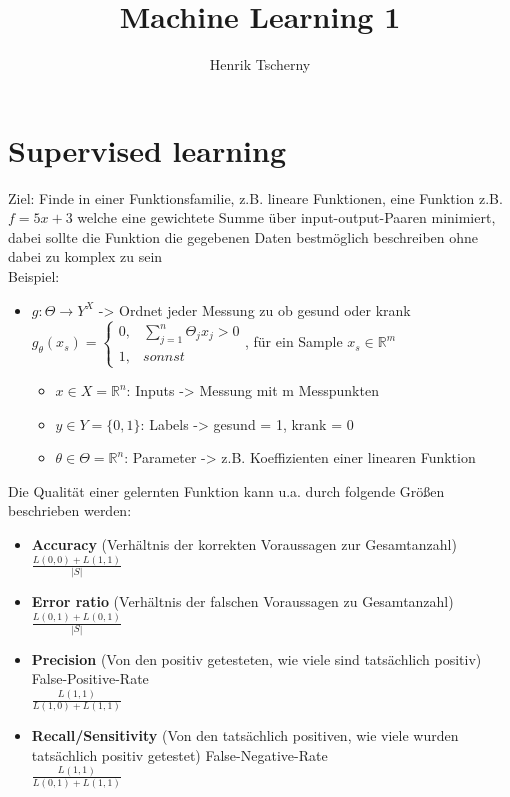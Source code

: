 \documentclass[12pt,a4paper]{article}
\title{Machine Learning 1}
\author{Henrik Tscherny}
\newcommand{\nl}{\\[0.1cm]}
\begin{document}
\maketitle
\tableofcontents

\section{Supervised learning}
Ziel: Finde in einer Funktionsfamilie, z.B. lineare Funktionen, eine Funktion z.B. $f = 5x+3$ welche eine gewichtete Summe über input-output-Paaren minimiert, dabei sollte die Funktion die gegebenen Daten bestmöglich beschreiben ohne dabei zu komplex zu sein\\

Beispiel:
\begin{itemize}
\item $g: \Theta \rightarrow Y^X$ -> Ordnet jeder Messung zu ob gesund oder krank\\
$g_{\theta}(x_s) = \begin{cases} 0, & \displaystyle\sum_{j=1}^n \Theta_j x_j > 0 \\ 1, & sonnst \end{cases}$, für ein Sample $x_s\in \mathbb{R}^m$
\begin{itemize}
\item $x \in X=\mathbb{R}^n$: Inputs ->  Messung mit m Messpunkten
\item $y \in Y = \{0,1\}$: Labels -> gesund = 1, krank = 0
\item $\theta \in \Theta = \mathbb{R}^n$: Parameter -> z.B. Koeffizienten einer linearen Funktion
\end{itemize}
\end{itemize}

Die Qualität einer gelernten Funktion kann u.a. durch folgende Größen beschrieben werden:
\begin{itemize}
\item \textbf{Accuracy} (Verhältnis der korrekten Voraussagen zur Gesamtanzahl)\nl
$\frac{L(0,0)+L(1,1)}{|S|}$ 
\item \textbf{Error ratio} (Verhältnis der falschen Voraussagen zu Gesamtanzahl)\nl
$\frac{L(0,1)+L(0,1)}{|S|}$
\item \textbf{Precision} (Von den positiv getesteten, wie viele sind tatsächlich positiv) False-Positive-Rate\nl
$\frac{L(1,1)}{L(1,0)+L(1,1)}$
\item \textbf{Recall/Sensitivity} (Von den tatsächlich positiven, wie viele wurden tatsächlich positiv getestet) False-Negative-Rate\nl
$\frac{L(1,1)}{L(0,1)+L(1,1)}$
\end{itemize}
\end{document}
